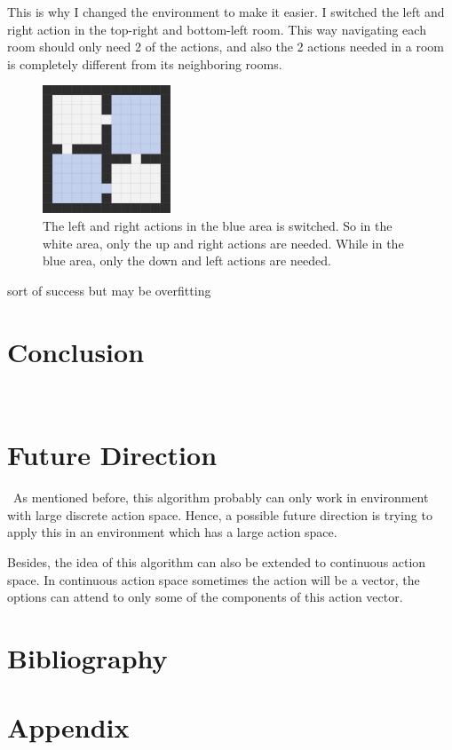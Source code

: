 \documentclass{article}
\begin{document}
	\quad This is why I changed the environment to make it easier. I switched the left and right action in the top-right and bottom-left room. This way navigating each room should only need 2 of the actions, and also the 2 actions needed in a room is completely different from its neighboring rooms.
	\begin{figure}[h]
		\centering
		\includegraphics[width=1.5in]{after.png}
		\caption{The left and right actions in the blue area is switched. So in the white area, only the up and right actions are needed. While in the blue area, only the down and left actions are needed.}
	\end{figure}

	\quad sort of success but may be overfitting
	\section{Conclusion}
	\qquad \ 
	\section{Future Direction}
	\qquad \ As mentioned before, this algorithm probably can only work in environment with large discrete action space. Hence, a possible future direction is trying to apply this in an environment which has a large action space.
	
	\quad Besides, the idea of this algorithm can also be extended to continuous action space. In continuous action space sometimes the action will be a vector, the options can attend to only some of the components of this action vector.
	\section*{Bibliography}
	
	
		
	\section*{Appendix}
	\appendix
\end{document}
